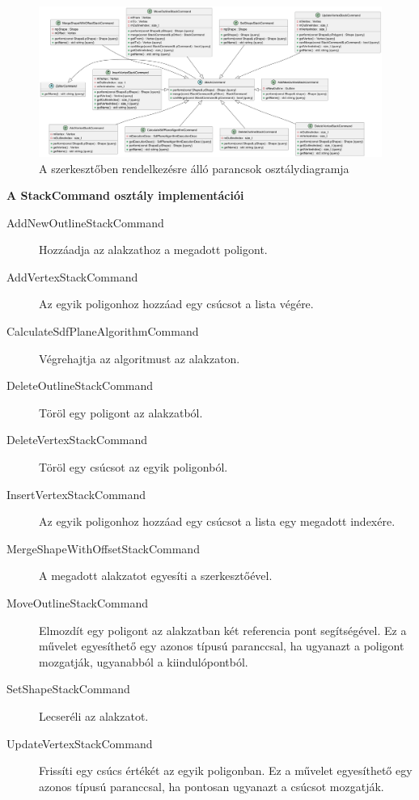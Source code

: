 \begin{figure}[H]
	\centering
	\includegraphics[width=1\linewidth]{images/class_editor_command.png}
	\caption{A szerkesztőben rendelkezésre álló parancsok osztálydiagramja}
	\label{fig:class_editor_command-1}
\end{figure}

\textbf{A StackCommand osztály implementációi}

\begin{description}
	\item[AddNewOutlineStackCommand] Hozzáadja az alakzathoz a megadott poligont.
	\item[AddVertexStackCommand] Az egyik poligonhoz hozzáad egy csúcsot a lista végére.
	\item[CalculateSdfPlaneAlgorithmCommand] Végrehajtja az algoritmust az alakzaton.
	\item[DeleteOutlineStackCommand] Töröl egy poligont az alakzatból.
	\item[DeleteVertexStackCommand] Töröl egy csúcsot az egyik poligonból.
	\item[InsertVertexStackCommand] Az egyik poligonhoz hozzáad egy csúcsot a lista egy megadott indexére.
	\item[MergeShapeWithOffsetStackCommand] A megadott alakzatot egyesíti a szerkesztőével.
	\item[MoveOutlineStackCommand] Elmozdít egy poligont az alakzatban két referencia pont segítségével. Ez a művelet egyesíthető egy azonos típusú paranccsal, ha ugyanazt a poligont mozgatják, ugyanabból a kiindulópontból.
	\item[SetShapeStackCommand] Lecseréli az alakzatot.
	\item[UpdateVertexStackCommand] Frissíti egy csúcs értékét az egyik poligonban. Ez a művelet egyesíthető egy azonos típusú paranccsal, ha pontosan ugyanazt a csúcsot mozgatják.
\end{description}

